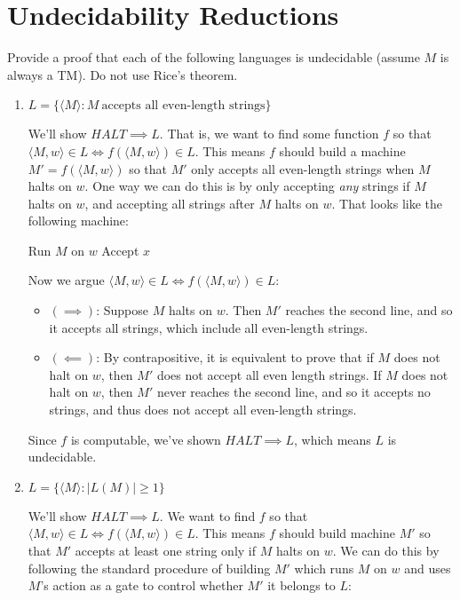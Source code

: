 \documentclass[fleqn]{article}
\begin{document}
\section{Undecidability Reductions}
Provide a proof that each of the following languages is undecidable (assume $M$ is always a TM). Do not use Rice's theorem.
\begin{enumerate}
    \item $L = \{\langle M \rangle : M~\text{accepts all even-length strings}\}$
    \begin{answer}
        We'll show $HALT \implies L$. That is, we want to find some function $f$ so that
        $\langle M, w \rangle \in L \iff f(\langle M, w\rangle) \in L$. This means $f$ should build
        a machine $M' = f(\langle M, w \rangle)$ so that $M'$ only accepts all even-length strings
        when $M$ halts on $w$. One way we can do this is by only accepting \textit{any} strings if $M$ halts on $w$, and accepting all strings after $M$ halts on $w$. That looks like the following machine:
        \begin{algorithmic}
                \State Run $M$ on $w$
                \State Accept $x$
            \EndFunction
        \end{algorithmic}
        Now we argue $\langle M, w \rangle \in L \iff f(\langle M, w\rangle) \in L$:
        \begin{itemize}
            \item $(\implies)$: Suppose $M$ halts on $w$. Then $M'$ reaches the second line, and so it accepts all strings, which include all even-length strings.
            \item $(\impliedby)$: By contrapositive, it is equivalent to prove that if $M$ does not halt on $w$, then $M'$ does not accept all even length strings. If $M$ does not halt on $w$, then $M'$ never reaches the second line, and so it accepts no strings, and thus does not accept all even-length strings.
        \end{itemize}
        Since $f$ is computable, we've shown $HALT \implies L$, which means $L$ is undecidable.
    \end{answer}
    \item $L = \{\langle M \rangle : |L(M)| \geq 1 \}$
    \begin{answer}
        We'll show $HALT \implies L$. We want to find $f$ so that 
        $\langle M, w \rangle \in L \iff f(\langle M, w \rangle) \in L$. This means $f$ should build machine $M'$ so that $M'$ accepts at least one string only if $M$ halts on $w$. We can do this by following the standard procedure of building $M'$ which runs $M$ on $w$ and uses $M$'s action as a gate to control whether $M'$ it belongs to $L$:

\end{answer}
\end{enumerate}
\end{document}
